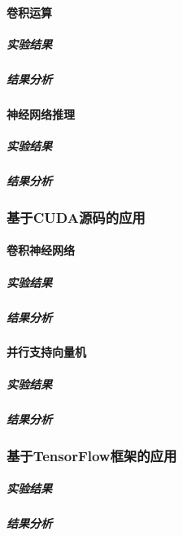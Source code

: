 \paragraph{卷积运算}
\subparagraph{实验结果}
\subparagraph{结果分析}
\paragraph{神经网络推理}
\subparagraph{实验结果}
\subparagraph{结果分析}
\subsubsection{基于CUDA源码的应用}
\paragraph{卷积神经网络}
\subparagraph{实验结果}
\subparagraph{结果分析}
\paragraph{并行支持向量机}
\subparagraph{实验结果}
\subparagraph{结果分析}
\subsubsection{基于TensorFlow框架的应用}
\subparagraph{实验结果}
\subparagraph{结果分析}